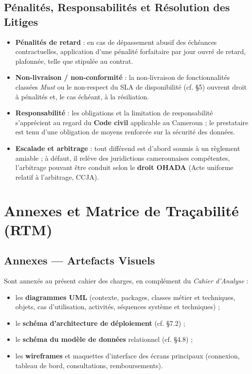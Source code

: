 \documentclass[11pt,a4paper]{article}
\begin{document}
\subsection{Pénalités, Responsabilités et Résolution des Litiges}
\begin{itemize}[leftmargin=1.4em]
  \item \textbf{Pénalités de retard} : en cas de dépassement abusif des échéances
  contractuelles, application d'une pénalité forfaitaire par jour ouvré de retard,
  plafonnée, telle que stipulée au contrat.
  \item \textbf{Non-livraison / non-conformité} : la non-livraison de fonctionnalités
  classées \emph{Must} ou le non-respect du SLA de disponibilité (cf. §5) ouvrent droit
  à pénalités et, le cas échéant, à la résiliation.
  \item \textbf{Responsabilité} : les obligations et la limitation de responsabilité
  s'apprécient au regard du \textbf{Code civil} applicable au Cameroun ; le prestataire
  est tenu d'une obligation de moyens renforcée sur la sécurité des données.
  \item \textbf{Escalade et arbitrage} : tout différend est d'abord soumis à un
  règlement amiable ; à défaut, il relève des juridictions camerounaises compétentes,
  l'arbitrage pouvant être conduit selon le \textbf{droit OHADA} (Acte uniforme relatif
  à l'arbitrage, CCJA).
\end{itemize}

\section{Annexes et Matrice de Traçabilité (RTM)}

\subsection{Annexes — Artefacts Visuels}
Sont annexés au présent cahier des charges, en complément du \emph{Cahier d'Analyse} :
\begin{itemize}[leftmargin=1.4em]
  \item les \textbf{diagrammes UML} (contexte, packages, classes métier et techniques,
  objets, cas d'utilisation, activités, séquences système et techniques) ;
  \item le \textbf{schéma d'architecture de déploiement} (cf. §7.2) ;
  \item le \textbf{schéma du modèle de données} relationnel (cf. §4.8) ;
  \item les \textbf{wireframes} et maquettes d'interface des écrans principaux
  (connexion, tableau de bord, consultations, remboursements).
\end{itemize}
\end{document}
